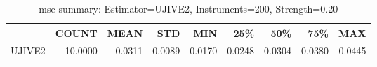 \begin{table}[ht]
\centering
\caption{mse summary: Estimator=UJIVE2, Instruments=200, Strength=0.20}
\begin{tabular}{lrrrrrrrr}
\toprule
 & COUNT & MEAN & STD & MIN & 25\% & 50\% & 75\% & MAX \\
\midrule
UJIVE2 & 10.0000 & 0.0311 & 0.0089 & 0.0170 & 0.0248 & 0.0304 & 0.0380 & 0.0445 \\
\bottomrule
\end{tabular}
\end{table}

